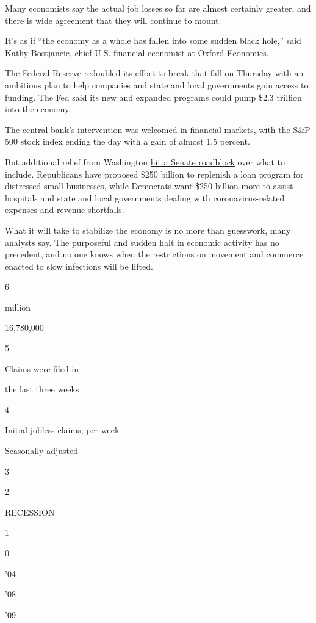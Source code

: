 Many economists say the actual job losses so far are almost certainly
greater, and there is wide agreement that they will continue to mount.

It's as if ``the economy as a whole has fallen into some sudden black
hole,'' said Kathy Bostjancic, chief U.S. financial economist at Oxford
Economics.

The Federal Reserve
\href{https://www.nytimes3xbfgragh.onion/2020/03/15/business/economy/federal-reserve-coronavirus.html}{redoubled
its effort} to break that fall on Thursday with an ambitious plan to
help companies and state and local governments gain access to funding.
The Fed said its new and expanded programs could pump \$2.3 trillion
into the economy.

The central bank's intervention was welcomed in financial markets, with
the S\&P 500 stock index ending the day with a gain of almost 1.5
percent.

But additional relief from Washington
\href{https://www.nytimes3xbfgragh.onion/2020/04/09/us/politics/congress-coronavirus-small-businesses.html}{hit
a Senate roadblock} over what to include. Republicans have proposed
\$250 billion to replenish a loan program for distressed small
businesses, while Democrats want \$250 billion more to assist hospitals
and state and local governments dealing with coronavirus-related
expenses and revenue shortfalls.

What it will take to stabilize the economy is no more than guesswork,
many analysts say. The purposeful and sudden halt in economic activity
has no precedent, and no one knows when the restrictions on movement and
commerce enacted to slow infections will be lifted.

6

million

16,780,000

5

Claims were filed in

the last three weeks

4

Initial jobless claims, per week

Seasonally adjusted

3

2

RECESSION

1

0

'04

'08

'09

